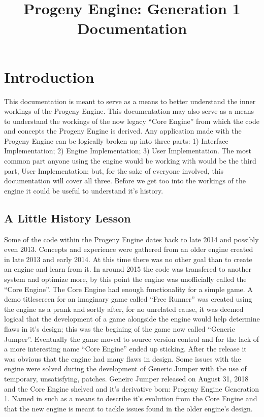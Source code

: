 \documentclass[12pt]{article}
\begin{document}
\title{Progeny Engine: Generation 1\\ Documentation}
\iffalse
\author{Sasha C. Gervais-Tourangeau}
\fi
\maketitle

\section{Introduction}
This documentation is meant to serve as a means to better understand the inner workings of the Progeny Engine.
This documentation may also serve as a means to understand the workings of the now legacy ``Core Engine'' from which the code and concepts the Progeny Engine is derived. Any application made with the Progeny Engine can be logically broken up into three parts: 1) Interface Implementation; 2) Engine Implementation; 3) User Implementation. The most common part anyone using the engine would be working with would be the third part, User Implementation; but, for the sake of everyone involved, this documentation will cover all three. Before we get too into the workings of the engine it could be useful to understand it's history.

\subsection{A Little History Lesson}
Some of the code within the Progeny Engine dates back to late 2014 and possibly even 2013. Concepts and experience were gathered from an older engine created in late 2013 and early 2014. At this time there was no other goal than to create an engine and learn from it. In around 2015 the code was transfered to another system and optimize more, by this point the engine was unofficially called the ``Core Engine''. The Core Engine had enough functionality for a simple game. A demo titlescreen for an imaginary game called ``Free Runner'' was created using the engine as a prank and sortly after, for no unrelated cause, it was deemed logical that the development of a game alongside the engine would help determine flaws in it's design; this was the begining of the game now called ``Generic Jumper''. Eventually the game moved to source version control and for the lack of a more interesting name ``Core Engine'' ended up sticking. After the release it was obvious that the engine had many flaws in design. Some issues with the engine were solved during the development of Generic Jumper with the use of temporary, unsatisfying, patches. Geneirc Jumper released on August 31, 2018 and the Core Engine shelved and it's derivative born: Progeny Engine Generation 1. Named in such as a means to describe it's evolution from the Core Engine and that the new engine is meant to tackle issues found in the older engine's design.
\end{document}
